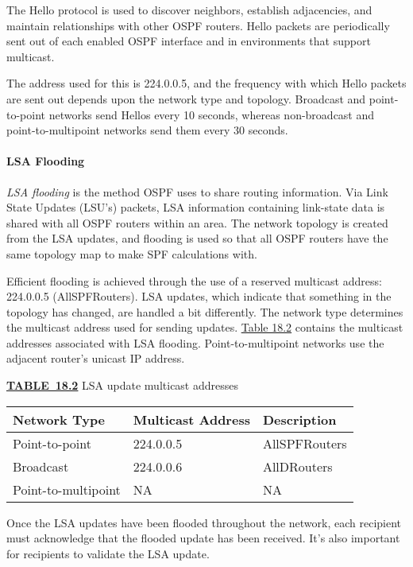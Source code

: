 The Hello protocol is used to discover neighbors, establish adjacencies,
and maintain relationships with other OSPF routers. Hello packets are
periodically sent out of each enabled OSPF interface and in environments
that support multicast.

\protect\hypertarget{c18.xhtmlux5cux23Page_752}{}{}The address used for
this is 224.0.0.5, and the frequency with which Hello packets are sent
out depends upon the network type and topology. Broadcast and
point-to-point networks send Hellos every 10 seconds, whereas
non-broadcast and point-to-multipoint networks send them every 30
seconds.

\paragraph{LSA Flooding}

\emph{LSA flooding} is the method OSPF uses to share routing
information. Via Link State Updates (LSU's) packets, LSA information
containing link-state data is shared with all OSPF routers within an
area. The network topology is created from the LSA updates, and flooding
is used so that all OSPF routers have the same topology map to make SPF
calculations with.

Efficient flooding is achieved through the use of a reserved multicast
address: 224.0.0.5 (AllSPFRouters). LSA updates, which indicate that
something in the topology has changed, are handled a bit differently.
The network type determines the multicast address used for sending
updates. \protect\hyperlink{c18.xhtmlux5cux23table18-2}{Table 18.2}
contains the multicast addresses associated with LSA flooding.
Point-to-multipoint networks use the adjacent router's unicast IP
address.

{\protect\hyperlink{c18.xhtmlux5cux23tableanchor18-2}{\textbf{TABLE~18.2}}
LSA update multicast addresses}

\begin{longtable}[]{@{}lll@{}}
\toprule
Network Type & Multicast Address & Description\tabularnewline
\midrule
\endhead
Point-to-point & 224.0.0.5 & AllSPFRouters\tabularnewline
Broadcast & 224.0.0.6 & AllDRouters\tabularnewline
Point-to-multipoint & NA & NA\tabularnewline
\bottomrule
\end{longtable}

Once the LSA updates have been flooded throughout the network, each
recipient must acknowledge that the flooded update has been received.
It's also important for recipients to validate the LSA update.

